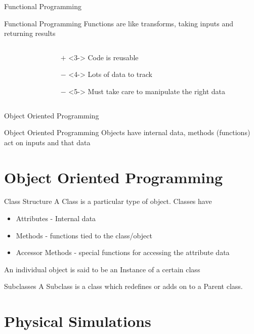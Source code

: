 \documentclass[mathserif]{beamer}
\providecommand{\inputcode}[1]{
  \begin{block}{}
    \scriptsize{}
  \end{block}
}
\begin{document}
\begin{frame}{Functional Programming}
  \begin{block}{Functional Programming}
    Functions are like transforms, taking inputs and returning results
  \end{block}
  \begin{columns}
    \begin{column}{0.49\linewidth}
      \uncover<2->{\inputcode{styles/functional}}
    \end{column}
    \begin{column}{0.49\linewidth}
      \begin{itemize}
        \item[$+$]<3-> Code is reusable
        \item[$-$]<4-> Lots of data to track
        \item[$-$]<5-> Must take care to manipulate the right data
      \end{itemize}
    \end{column}
  \end{columns}
\end{frame}

\begin{frame}{Object Oriented Programming}
  \begin{block}{Object Oriented Programming}
    Objects have internal data, methods (functions) act on inputs and that data
  \end{block}
  \visible<2->{\inputcode{styles/objective}}
\end{frame}

\section{Object Oriented Programming}

\begin{frame}{Class Structure}
  A \alert{Class} is a particular type of object. Classes have
  \begin{itemize}
    \item \alert{Attributes} - Internal data
    \item \alert{Methods} - functions tied to the class/object
    \item \alert{Accessor Methods} - special functions for accessing the attribute data
  \end{itemize}

  An individual object is said to be an \alert{Instance} of a certain class
\end{frame}

\begin{frame}{Subclasses}
  A \alert{Subclass} is a class which redefines or adds on to a \alert{Parent} class. 

  \inputcode{examples/student}
\end{frame}

\section{Physical Simulations}
\end{document}
